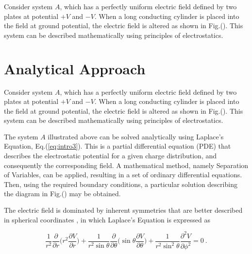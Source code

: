 \documentclass[a4paper]{jpconf}
\begin{document}
Consider system $A$, which has a perfectly uniform electric field defined by two plates at potential $+V$ and $-V$. When a long conducting cylinder is placed into the field at ground potential, the electric field is altered as shown in Fig.(). This system can be described mathematically using principles of electrostatics.


\section*{Analytical Approach}
Consider system $A$, which has a perfectly uniform electric field defined by two plates at potential $+V$ and $-V$. When a long conducting cylinder is placed into the field at ground potential, the electric field is altered as shown in Fig.(). This system can be described mathematically using principles of electrostatics.

The system $A$ illustrated above can be solved analytically using Laplace's Equation, Eq.(\ref{eq:intro3}). This is a partial differential equation (PDE) that describes the electrostatic potential for a given charge distribution, and consequently the corresponding field. A mathematical method, namely Separation of Variables, can be applied, resulting in a set of ordinary differential equations. Then, using the required boundary conditions, a particular solution describing the diagram in Fig.() may be obtained. \\ \par 
The electric field is dominated by inherent symmetries that are better described in spherical coordinates \cite{RHB-MathematicalMethods}, in which Laplace's Equation is expressed as

\begin{equation}
\frac{1}{r^2}\frac{\partial}{\partial r}\bigg(r^2 \frac{\partial V}{\partial r}\bigg) + \frac{1}{r^2 \sin \theta} \frac{\partial}{\partial \theta}\bigg(\sin \theta \frac{\partial V}{\partial \theta}\bigg) + \frac{1}{r^2 \sin^2 \theta}\frac{\partial^2 V}{\partial \phi^2} = 0~.
\label{eq:1}
\end{equation}
\end{document}
